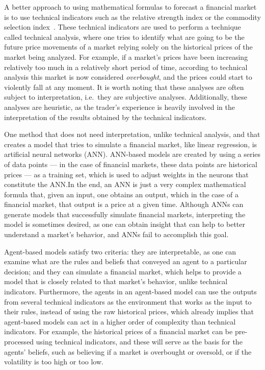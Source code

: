 \documentclass{ieeeaccess}
\begin{document}
A better approach to using mathematical formulas to forecast a financial market
is to use technical indicators such as the relative strength index or the
commodity selection index~\cite{Wilder1978}. These technical indicators are used
to perform a technique called technical analysis, where one tries to identify
what are going to be the future price movements of a market relying solely on
the historical prices of the market being analyzed. For example, if a market's
prices have been increasing relatively too much in a relatively short period of
time, according to technical analysis this market is now considered
\textit{overbought}, and the prices could start to violently fall at any
moment. It is worth noting that these analyses are often subject to
interpretation, i.e.\ they are subjective analyses. Additionally, these analyses
are heuristic, as the trader's experience is heavily involved in the
interpretation of the results obtained by the technical indicators.

One method that does not need interpretation, unlike technical analysis, and
that creates a model that tries to simulate a financial market, like linear
regression, is artificial neural networks (ANN). ANN-based models are created by
using a series of data points --- in the case of financial markets, these data
points are historical prices --- as a training set, which is used to adjust
weights in the neurons that constitute the ANN.\@ In the end, an ANN is just a
very complex mathematical formula that, given an input, one obtains an output,
which in the case of a financial market, that output is a price at a given
time. Although ANNs can generate models that successfully simulate financial
markets, interpreting the model is sometimes desired, as one can obtain insight
that can help to better understand a market's behavior, and ANNs fail to
accomplish this goal.

Agent-based models satisfy two criteria: they are interpretable, as one can
examine what are the rules and beliefs that conveyed an agent to a particular
decision; and they can simulate a financial market, which helps to provide a
model that is closely related to that market's behavior, unlike technical
indicators. %
Furthermore, the agents in an agent-based model can use the outputs from several
technical indicators as the environment that works as the input to their rules,
instead of using the raw historical prices, which already implies that
agent-based models can act in a higher order of complexity than technical
indicators. For example, the historical prices of a financial market can be
pre-processed using technical indicators, and these will serve as the basis for
the agents' beliefs, such as believing if a market is overbought or oversold, or
if the volatility is too high or too low.
\end{document}
